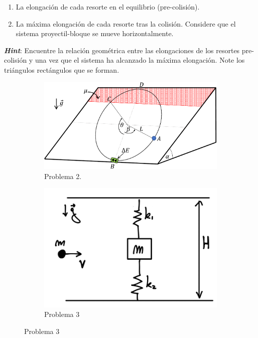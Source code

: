 \documentclass[letterpaper,11pt]{article}
\begin{document}
\begin{enumerate}
    \begin{enumerate}
        \item La elongación de cada resorte en el equilibrio (pre-colisión).
        
        \item La máxima elongación de cada resorte tras la colisión. Considere que el sistema proyectil-bloque se mueve horizontalmente.
    \end{enumerate}
    
    \textbf{\textit{Hint}}: Encuentre la relación geométrica entre las elongaciones de los resortes pre-colisión y una vez que el sistema ha alcanzado la máxima elongación. Note los triángulos rectángulos que se forman.
    
\begin{figure}[H]
        \centering
        \begin{subfigure}[t]{0.45\textwidth}
            \centering
            \includegraphics[width=0.9\linewidth]{2022-1/img/auxCrec2/p2c2.pdf}
            \caption{Problema 2.}
        \end{subfigure}
        \hspace{1em}
        \begin{subfigure}[t]{0.40\textwidth}
            \centering
            \includegraphics[width=0.8\linewidth]{2022-1/img/auxCrec2/p3c2.png}
            \caption{Problema 3}
        \end{subfigure}
\end{figure}


\end{enumerate}
\end{document}
